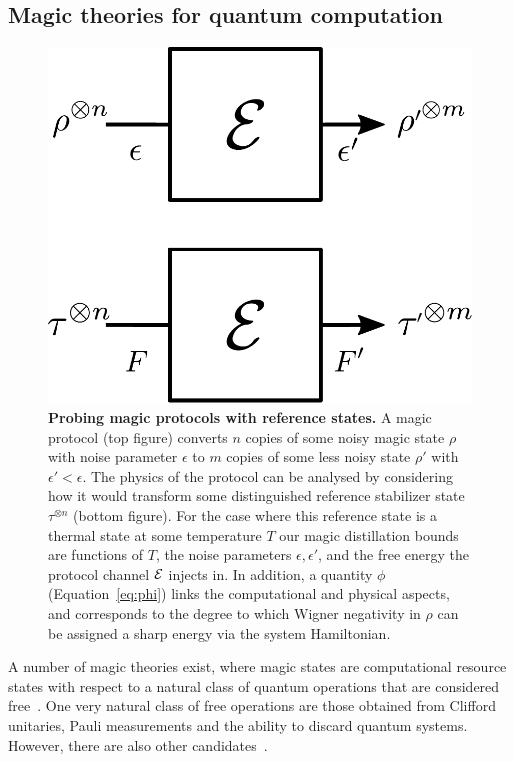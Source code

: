 \documentclass[pra,
aps,
twocolumn,
superscriptaddress,
groupedaddress,
nofootinbib,
reprint
]{revtex4-1}
\begin{document}
\subsection{Magic theories for quantum computation}
\label{sec:mono}
\begin{figure}[t]
    \centering
        \includegraphics[scale=0.3]{figs/protocol_diagram.pdf}
    \caption{\textbf{Probing magic protocols with reference states.} 
	A magic protocol (top figure) converts $n$ copies of some noisy magic state $\rho$ with noise parameter $\epsilon$ to $m$ copies of some less noisy state $\rho'$ with $\epsilon' < \epsilon$. The physics of the protocol can be analysed by considering how it would transform some distinguished reference stabilizer state $\tau^{\otimes n}$ (bottom figure). For the case where this reference state is a thermal state at some temperature $T$ our magic distillation bounds are functions of $T$, the noise parameters $\epsilon, \epsilon'$, and the free energy the protocol channel ${\mathcal E}$ injects in. In addition, a quantity $\phi$ (Equation~\ref{eq:phi}) links the computational and physical aspects, and corresponds to the degree to which Wigner negativity in $\rho$ can be assigned a sharp energy via the system Hamiltonian.}
    \label{fig:sketch}
\end{figure}
A number of magic theories exist, where magic states are computational resource states with respect to a natural class of quantum operations that are considered free~\cite{Gour_2019}. One very natural class of free operations are those obtained from Clifford unitaries, Pauli measurements and the ability to discard quantum systems. However, there are also other candidates~\cite{cit:ahmadi, cit:seddon, Wang_2019}.
\end{document}
